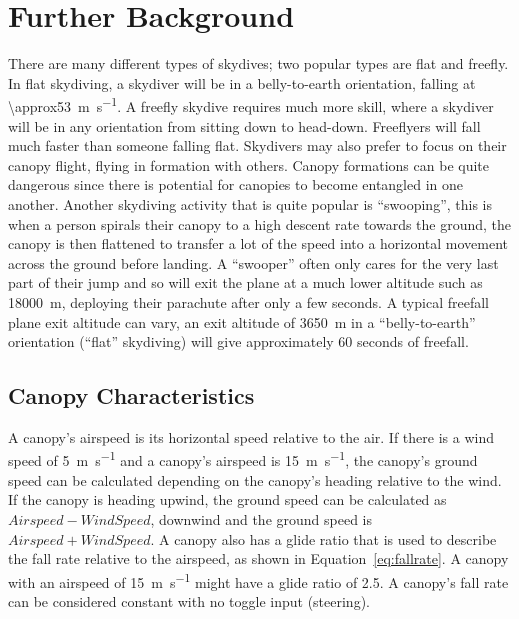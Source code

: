 \section{Further Background}\label{sec:further-background}
There are many different types of skydives; two popular types are flat and freefly. In flat skydiving, a skydiver will be in a belly-to-earth orientation, falling at \SI{\approx53}{\metre\per\second}. A freefly skydive requires much more skill, where a skydiver will be in any orientation from sitting down to head-down. Freeflyers will fall much faster than someone falling flat.
Skydivers may also prefer to focus on their canopy flight, flying in formation with others. Canopy formations can be quite dangerous since there is potential for canopies to become entangled in one another.
Another skydiving activity that is quite popular is ``swooping'', this is when a person spirals their canopy to a high descent rate towards the ground, the canopy is then flattened to transfer a lot of the speed into a horizontal movement across the ground before landing. A ``swooper'' often only cares for the very last part of their jump and so will exit the plane at a much lower altitude such as \SI{18000}{\metre}, deploying their parachute after only a few seconds.
A typical freefall plane exit altitude can vary, an exit altitude of \SI{3650}{\metre} in a ``belly-to-earth'' orientation (``flat'' skydiving) will give approximately 60 seconds of freefall.

\subsection{Canopy Characteristics}
A canopy's airspeed is its horizontal speed relative to the air. If there is a wind speed of \SI{5}{\metre\per\second} and a canopy's airspeed is \SI{15}{\metre\per\second}, the canopy's ground speed can be calculated depending on the canopy's heading relative to the wind. If the canopy is heading upwind, the ground speed can be calculated as $Airspeed - WindSpeed$, downwind and the ground speed is $Airspeed + WindSpeed$.
A canopy also has a glide ratio that is used to describe the fall rate relative to the airspeed, as shown in Equation~\ref{eq:fallrate}. A canopy with an airspeed of \SI{15}{\metre\per\second} might have a glide ratio of 2.5. A canopy's fall rate can be considered constant with no toggle input (steering).

